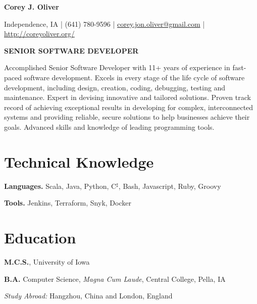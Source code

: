 \documentclass[10pt,letterpaper]{article}
\def\name{Corey J. Oliver}
\renewenvironment{itemize}{
  \begin{list}{}{
      \setlength{\leftmargin}{1.5em}
      \setlength{\itemsep}{0.25em}
      \setlength{\parskip}{0pt}
      \setlength{\parsep}{0.25em}
    }
  }{
  \end{list}
}
\begin{document}

\centerline{\huge \bf \name}

\bigskip

\centerline{Independence, IA | (641) 780-9596 | %
  \href{mailto:corey.jon.oliver@gmail.com}{corey.jon.oliver@gmail.com} |
  \href{http://coreyoliver.org/}{http://coreyoliver.org/}}

\hrulefill{}

\bigskip

\centerline{\bf SENIOR SOFTWARE DEVELOPER}

\bigskip

\noindent
Accomplished Senior Software Developer with 11+ years of experience in
fast-paced software development. Excels in every stage of the life cycle of
software development, including design, creation, coding, debugging, testing and
maintenance. Expert in devising innovative and tailored solutions. Proven track
record of achieving exceptional results in developing for complex,
interconnected systems and providing reliable, secure solutions to help
businesses achieve their goals. Advanced skills and knowledge of leading
programming tools.

\section*{Technical Knowledge}
\begin{itemize}
  \item \textbf{Languages.} Scala, Java, Python, C$^\sharp$, Bash,
        Javascript, Ruby, Groovy
  \item \textbf{Tools.} Jenkins, Terraform, Snyk, Docker
\end{itemize}

\section*{Education}

\begin{itemize}
  \item \textbf{M.C.S.}, University of Iowa
  \item \textbf{B.A.} Computer Science, \textit{Magna Cum Laude}, Central
        College, Pella, IA
        \begin{itemize}
          \item \textit{Study Abroad:} Hangzhou, China and
                London, England
        \end{itemize}
\end{itemize}
\end{document}
